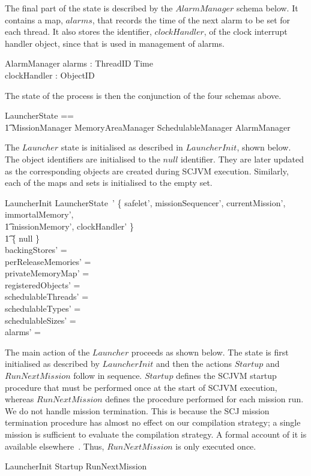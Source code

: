 The final part of the state is described by the $AlarmManager$ schema
below.
It contains a map, $alarms$, that records the time of the next alarm
to be set for each thread.
It also stores the identifier, $clockHandler$, of the clock interrupt
handler object, since that is used in management of alarms.
\begin{schema}{AlarmManager}
	alarms : ThreadID \ffun Time \\
	clockHandler : ObjectID
\end{schema}

The state of the process is then the conjunction of the four schemas
above.
\begin{circusaction}
  \circstate LauncherState == \\
  \t1 MissionManager \land MemoryAreaManager \land SchedulableManager \land AlarmManager
\end{circusaction}

The $Launcher$ state is initialised as described in $LauncherInit$,
shown below.
The object identifiers are initialised to the $null$ identifier.
They are later updated as the corresponding objects are created during
SCJVM execution.
Similarly, each of the maps and sets is initialised to the empty set.
\begin{schema}{LauncherInit}
  LauncherState~'
\where
  \{ safelet', missionSequencer', currentMission', immortalMemory', \\
  \t1 missionMemory', clockHandler' \} \\
  \t1 {} \subseteq \{ null \} \\
  backingStores' = \emptyset \\
  perReleaseMemories' = \emptyset \\
  privateMemoryMap' = \emptyset \\
  registeredObjects' = \emptyset \\
  schedulableThreads' = \emptyset \\
  schedulableTypes' = \emptyset \\
  schedulableSizes' = \emptyset \\
  alarms' = \emptyset
\end{schema}

The main action of the $Launcher$ proceeds as shown below.
The state is first initialised as described by $LauncherInit$ and then
the actions $Startup$ and $RunNextMission$ follow in sequence.
$Startup$ defines the SCJVM startup procedure that must be performed
once at the start of SCJVM execution, whereas $RunNextMission$ defines
the procedure performed for each mission run.
We do not handle mission termination.
This is because the SCJ mission termination procedure has almost no
effect on our compilation strategy; a single mission is sufficient to
evaluate the compilation strategy.
A formal account of it is available elsewhere~\cite{cavalcanti2013,
  luckcuck2016, zeyda2011}. 
Thus, $RunNextMission$ is only executed once.
\begin{circusaction}
  \circspot \lschexpract LauncherInit \rschexpract \circseq Startup \circseq RunNextMission
\end{circusaction}

